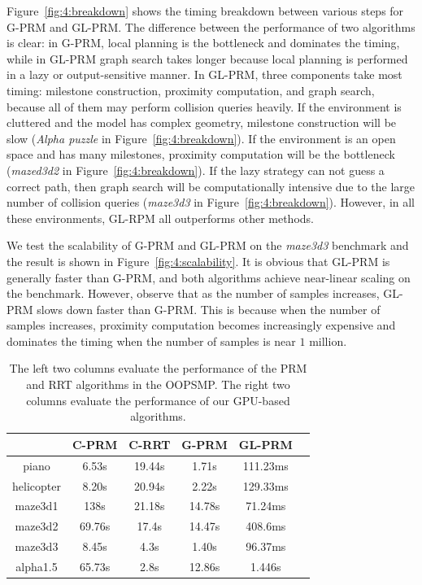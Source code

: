 Figure~\ref{fig:4:breakdown} shows the timing breakdown between various steps for G-PRM and GL-PRM. The difference between the performance of two algorithms is clear: in G-PRM, local planning is the bottleneck and dominates the timing, while in GL-PRM graph search takes longer because local planning is performed in a lazy or output-sensitive manner. In GL-PRM, three components take most timing: milestone construction, proximity computation, and graph search, because all of them may perform collision queries heavily. If the environment is cluttered and the model has complex geometry, milestone construction will be slow (\emph{Alpha puzzle} in Figure~\ref{fig:4:breakdown}). If the environment is an open space and has many milestones, proximity computation will be the bottleneck (\emph{mazed3d2} in Figure~\ref{fig:4:breakdown}). If the lazy strategy can not guess a correct path, then graph search will be computationally intensive due to the large number of collision queries (\emph{maze3d3} in Figure~\ref{fig:4:breakdown}). However, in all these environments, GL-RPM all outperforms other methods.

We test the scalability of G-PRM and GL-PRM on the \emph{maze3d3} benchmark and the result is shown in Figure~\ref{fig:4:scalability}. It is obvious that GL-PRM is generally faster than G-PRM, and both algorithms achieve near-linear scaling on the benchmark. However, observe that as the number of samples increases, GL-PRM slows down faster than G-PRM. This is because when the number of samples increases, proximity computation becomes increasingly expensive and dominates the timing when the number of samples is near $1$ million.

\begin{table}[!htb]
\begin{center}
\begin{small}
\begin{tabular}{|c|c|c|c|c|c|} \hline
               & C-PRM & C-RRT & G-PRM & GL-PRM \\ \hline \hline
piano          & 6.53s   &  19.44s &   1.71s   &     111.23ms      \\  \hline
helicopter          & 8.20s     &  20.94s    &  2.22s    &  129.33ms      \\ \hline
maze3d1        & 138s  &  21.18s    &     14.78s &     71.24ms    \\ \hline
maze3d2        & 69.76s &  17.4s   &   14.47s   &      408.6ms   \\ \hline
maze3d3        & 8.45s   &   4.3s   &  1.40s    &     96.37ms    \\ \hline
alpha1.5       & 65.73s  &   2.8s   &    12.86s  &   1.446s      \\ \hline
\end{tabular}
\end{small}
\end{center}
\caption[Performance comparison between the PRM and RRT implementations in OOPSMP and the GPU-based planner]{The left two columns evaluate the performance of the PRM and RRT algorithms in the OOPSMP. The right two columns evaluate the performance of our GPU-based algorithms.}\label{tab:4:complexity}
\end{table}

